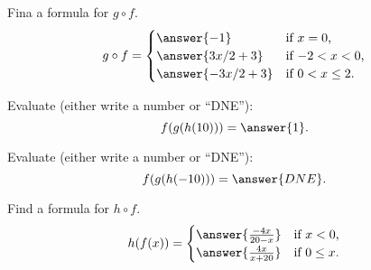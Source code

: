 \documentclass{ximera}
\begin{document}
  \begin{exercise}
    Fina a formula for $g\circ f$.
    \[
    g\circ f =
    \begin{cases}
      \answer{-1} & \text{if $x=0$,}\\
      \answer{3x/2 + 3} &\text{if $-2<x<0$,}\\
      \answer{-3x/2 + 3}&\text{if $0<x\le 2$.}
    \end{cases}
    \]
  \end{exercise}
  \begin{exercise}
    Evaluate (either write a number or ``DNE''):
    \[
    f(g(h(10))) = \answer{1}.
    \]
  \end{exercise}
  \begin{exercise}
    Evaluate (either write a number or ``DNE''):
    \[
    f(g(h(-10))) = \answer{DNE}.
    \]
  \end{exercise}
  \begin{exercise}
    Find a formula for $h\circ f$.
    \[
    h(f(x)) =
    \begin{cases}
      \answer{\frac{-4x}{20-x}} & \text{if $x<0$,}\\
      \answer{\frac{4x}{x+20}}  & \text{if $0\le x$.}
    \end{cases}
    \]
  \end{exercise}
\end{document}
